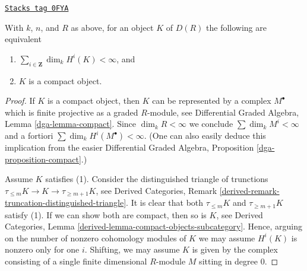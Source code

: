 \begin{lemma}
\label{equiv-lemma-perfect-for-R}
\href{https://stacks.math.columbia.edu/tag/0FYA}{\texttt{Stacks tag 0FYA}}

With $k$, $n$, and $R$ as above, for an object $K$ of $D(R)$
the following are equivalent
\begin{enumerate}
\item $\sum_{i \in \mathbf{Z}} \dim_k H^i(K) < \infty$, and
\item $K$ is a compact object.
\end{enumerate}
\end{lemma}

\begin{proof}
If $K$ is a compact object, then $K$ can be represented by a complex
$M^\bullet$ which is finite projective as a graded $R$-module, see
Differential Graded Algebra, Lemma \ref{dga-lemma-compact}.
Since $\dim_k R < \infty$ we conclude $\sum \dim_k M^i < \infty$
and a fortiori $\sum \dim_k H^i(M^\bullet) < \infty$.
(One can also easily deduce this implication from the easier
Differential Graded Algebra, Proposition \ref{dga-proposition-compact}.)

\medskip\noindent
Assume $K$ satisfies (1). Consider the distinguished triangle
of trunctions $\tau_{\leq m}K \to K \to \tau_{\geq m + 1}K$, see
Derived Categories, Remark
\ref{derived-remark-truncation-distinguished-triangle}.
It is clear that both $\tau_{\leq m}K$ and $\tau_{\geq m + 1} K$
satisfy (1). If we can show both are compact, then so is $K$, see
Derived Categories, Lemma \ref{derived-lemma-compact-objects-subcategory}.
Hence, arguing on the number of nonzero cohomology modules of $K$
we may assume $H^i(K)$ is nonzero only for one $i$.
Shifting, we may assume $K$ is given by the complex
consisting of a single finite dimensional $R$-module $M$ sitting
in degree $0$.


\end{proof}
